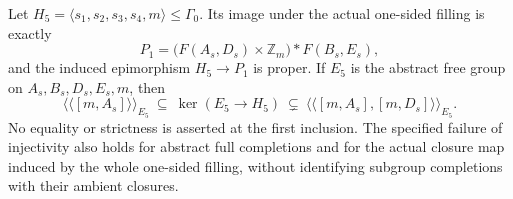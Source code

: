 Let $H_5=\langle s_1,s_2,s_3,s_4,m\rangle\leq\Gamma_0$.
Its image under the actual one-sided filling is exactly
\begin{equation}\label{eq:B131-one-sided-group}
 P_1=\bigl(F(A_s,D_s)\times\mathbb Z_m\bigr)*F(B_s,E_s),
\end{equation}
and the induced epimorphism $H_5\to P_1$ is proper. If $E_5$ is the
abstract free group on $A_s,B_s,D_s,E_s,m$, then
\begin{equation}\label{eq:B131-kernel-sandwich}
 \langle\!\langle[m,A_s]\rangle\!\rangle_{E_5}
 \ \subseteq\ \ker(E_5\to H_5)
 \ \subsetneq\
 \langle\!\langle[m,A_s],[m,D_s]\rangle\!\rangle_{E_5}.
\end{equation}
No equality or strictness is asserted at the first inclusion. The
specified failure of injectivity also holds for abstract full completions
and for the actual closure map induced by the whole one-sided filling,
without identifying subgroup completions with their ambient closures.

